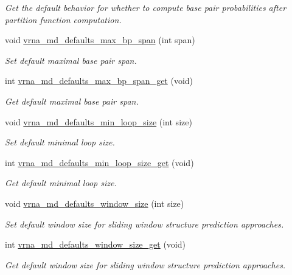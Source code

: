 \begin{DoxyCompactItemize}
\begin{DoxyCompactList}\small\item\em Get the default behavior for whether to compute base pair probabilities after partition function computation. \end{DoxyCompactList}\item 
void \mbox{\hyperlink{group__model__details_ga4c4bc962f09b4480cb8499f1cf8ae4ec}{vrna\+\_\+md\+\_\+defaults\+\_\+max\+\_\+bp\+\_\+span}} (int span)
\begin{DoxyCompactList}\small\item\em Set default maximal base pair span. \end{DoxyCompactList}\item 
int \mbox{\hyperlink{group__model__details_gaa60f989e062fecd4d4bac89c1883da85}{vrna\+\_\+md\+\_\+defaults\+\_\+max\+\_\+bp\+\_\+span\+\_\+get}} (void)
\begin{DoxyCompactList}\small\item\em Get default maximal base pair span. \end{DoxyCompactList}\item 
void \mbox{\hyperlink{group__model__details_gac152f1e78c1058a10261022c8dfda0f7}{vrna\+\_\+md\+\_\+defaults\+\_\+min\+\_\+loop\+\_\+size}} (int size)
\begin{DoxyCompactList}\small\item\em Set default minimal loop size. \end{DoxyCompactList}\item 
int \mbox{\hyperlink{group__model__details_ga5cc691174a75c652807dc361b617632a}{vrna\+\_\+md\+\_\+defaults\+\_\+min\+\_\+loop\+\_\+size\+\_\+get}} (void)
\begin{DoxyCompactList}\small\item\em Get default minimal loop size. \end{DoxyCompactList}\item 
void \mbox{\hyperlink{group__model__details_ga7b802ce0e8c3181bf5cb580de6d5b26a}{vrna\+\_\+md\+\_\+defaults\+\_\+window\+\_\+size}} (int size)
\begin{DoxyCompactList}\small\item\em Set default window size for sliding window structure prediction approaches. \end{DoxyCompactList}\item 
int \mbox{\hyperlink{group__model__details_ga670146a9aa3ba77f4d422d60b7c30ac9}{vrna\+\_\+md\+\_\+defaults\+\_\+window\+\_\+size\+\_\+get}} (void)
\begin{DoxyCompactList}\small\item\em Get default window size for sliding window structure prediction approaches. \end{DoxyCompactList}\item 

\end{DoxyCompactItemize}
